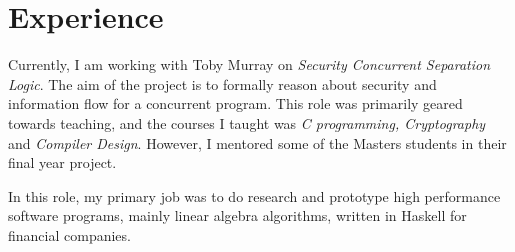 \documentclass[11pt,a4paper,sans]{moderncv}        %
\begin{document}
\section{Experience}
  {Currently, I am working with Toby Murray  on \textit{Security Concurrent Separation Logic}. The aim of the project is 
  to formally reason about security and information flow for a concurrent program.}
{This role was primarily geared towards teaching, and 
the courses I taught was \textit{C programming, Cryptography} and  \textit{Compiler Design}. However, I mentored some 
of the Masters students in their final year project.}

{In this role, my primary job was to do research and prototype high performance software programs, mainly linear algebra algorithms,
written in Haskell for financial companies.}
\end{document}

